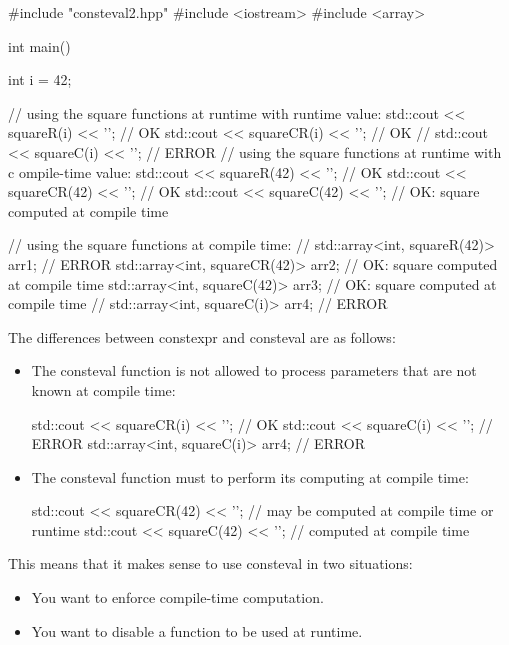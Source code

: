 
\begin{cpp}
#include "consteval2.hpp"
#include <iostream>
#include <array>

int main()
{
	int i = 42;
	
	// using the square functions at runtime with runtime value:
	std::cout << squareR(i) << '\n'; // OK
	std::cout << squareCR(i) << '\n'; // OK
	// std::cout << squareC(i) << ’’; // ERROR
	// using the square functions at runtime with c
	ompile-time value:
	std::cout << squareR(42) << '\n'; // OK
	std::cout << squareCR(42) << '\n'; // OK
	std::cout << squareC(42) << '\n'; // OK: square computed at compile time
	
	// using the square functions at compile time:
	// std::array<int, squareR(42)> arr1; // ERROR
	std::array<int, squareCR(42)> arr2; // OK: square computed at compile time
	std::array<int, squareC(42)> arr3; // OK: square computed at compile time
	// std::array<int, squareC(i)> arr4; // ERROR
}
\end{cpp}

The differences between constexpr and consteval are as follows:

\begin{itemize}
\item 
The consteval function is not allowed to process parameters that are not known at compile time:

\begin{cpp}
std::cout << squareCR(i) << '\n'; // OK
std::cout << squareC(i) << '\n'; // ERROR
std::array<int, squareC(i)> arr4; // ERROR
\end{cpp}

\item 
The consteval function must to perform its computing at compile time:

\begin{cpp}
std::cout << squareCR(42) << '\n'; // may be computed at compile time or runtime
std::cout << squareC(42) << '\n'; // computed at compile time
\end{cpp}

\end{itemize}

This means that it makes sense to use consteval in two situations:

\begin{itemize}
\item 
You want to enforce compile-time computation.

\item 
You want to disable a function to be used at runtime.
\end{itemize}


